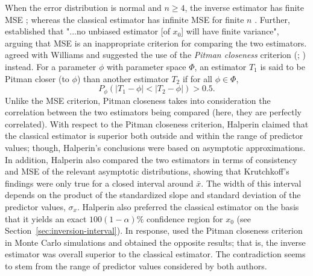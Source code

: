 \documentclass[cmfont,usenames,dvipsnames,leqno]{afit-etd}\usepackage[]{graphicx}\usepackage[]{color}
\begin{document}
When the error distribution is normal and $n \ge 4$, the inverse estimator has finite \ac{MSE} \citep{oman_exact_1985}; whereas the classical estimator has infinite \ac{MSE} for finite $n$ \citep{williams_note_1969}. Further, \citet{williams_note_1969} established that "...no unbiased estimator [of $x_0$] will have finite variance", arguing that \ac{MSE} is an inappropriate criterion for comparing the two estimators. \citet{halperin_inverse_1970} agreed with Williams and suggested the use of the \textit{Pitman closeness} criterion (\citealt{pitman_closest_1937}; \citealt[pg. 290]{mood_introduction_1974}) instead. For a parameter $\phi$ with parameter space $\Phi$, an estimator $T_1$ is said to be Pitman closer (to $\phi$) than another estimator $T_2$ if for all $\phi \in \Phi$,
\begin{equation}
  P_\phi(|T_1 - \phi| < |T_2 - \phi|) > 0.5.
\end{equation}
Unlike the \ac{MSE} criterion, Pitman closeness takes into consideration the correlation between the two estimators being compared (here, they are perfectly correlated). With respect to the Pitman closeness criterion, Halperin claimed that the classical estimator is superior both outside and within the range of predictor values; though, Halperin's conclusions were based on asymptotic approximations. In addition, Halperin also compared the two estimators in terms of consistency and \ac{MSE} of the relevant asymptotic distributions, showing that Krutchkoff's findings were only true for a closed interval around $\bar{x}$. The width of this interval depends on the product of the standardized slope and standard deviation of the predictor values, $\sigma_x$. Halperin also preferred the classical estimator on the basis that it yields an exact $100(1 - \alpha)\%$ confidence region for $x_0$ (see Section~\ref{sec:inversion-interval}). In response, \citet{krutchkoff_calibration_1972} used the Pitman closeness criterion in Monte Carlo simulations and obtained the opposite results; that is, the inverse estimator was overall superior to the classical estimator. The contradiction seems to stem from the range of predictor values considered by both authors.
\end{document}
